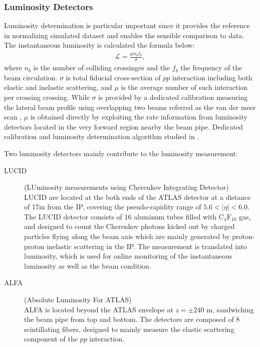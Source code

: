 \subsubsection{Luminosity Detectors}
Luminosity determination is particular important since it provides the reference in normalizing simulated dataset and enables the sensible comparison to data. 
The instantaneous luminosity is calculated the formula below:
\begin{align}
\mathcal{L} = \frac{\mu n_b f_b}{\sigma},
\end{align}
where $n_b$ is the number of colliding crossinges and the $f_b$ the frequency of the beam circulation.
$\sigma$ is total fiducial cross-section of $pp$ interaction including both elastic and inelastic scattering, and $\mu$ is the average number of such interaction per crossing crossing. While $\sigma$ is provided by a dedicated calibration measuring the lateral beam profile using overlapping two beams referred as the van der meer scan \cite{VdMScan}, $\mu$ is obtained directly by exploiting the rate information from luminosity detectors located in the very forward region nearby the beam pipe. Dedicated calibration and luminosity determination algorithm studied in \cite{LumiMeasurement}.

Two luminosity detectors mainly contribute to the luminosity measurement:
\begin{description}

\item[LUCID] (LUminosity measurements using Cherenkov Integrating Detector) \\
LUCID are located at the both ends of the ATLAS detector at a distance of 17m from the IP, covering the pseudo-rapidity range of $5.6<|\eta|<6.0$.
The LUCID detector consists of 16 aluminum tubes filled with $\mathrm{C}_4 \mathrm{F}_{10}$ gas, 
and designed to count the Cherenkov photons kicked out by charged particles flying along the beam axis which are mainly generated by proton-proton inelastic scattering in the IP.
The measurement is translated into luminosity, which is used for online monitoring of the instantaneous luminosity as well as the beam condition. 



\item[ALFA] (Absolute Luminosity For ATLAS) \\
ALFA is located beyond the ATLAS envelope at $z=\pm 240$ m, sandwiching the beam pipe from top and bottom.
The detectors are composed of 8 scintillating fibers, designed to mainly measure the elastic scattering component of the $pp$ interaction.

\end{description}



